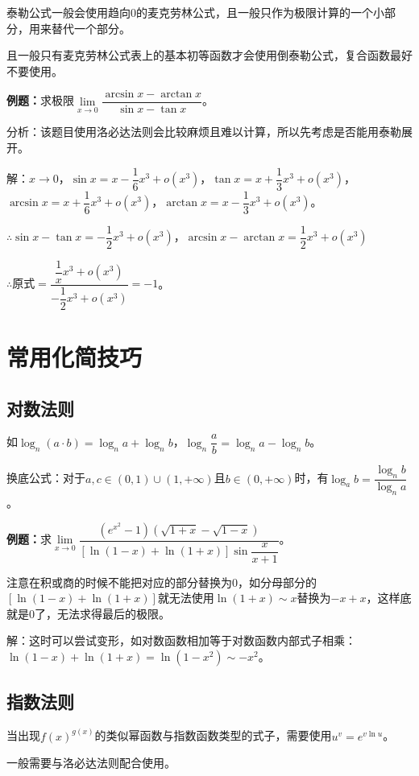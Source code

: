 \documentclass[UTF8, 12pt]{ctexart}
\begin{document}
泰勒公式一般会使用趋向0的麦克劳林公式，且一般只作为极限计算的一个小部分，用来替代一个部分。

且一般只有麦克劳林公式表上的基本初等函数才会使用倒泰勒公式，复合函数最好不要使用。

\textbf{例题：}求极限$\lim\limits_{x\to 0}\dfrac{\arcsin x-\arctan x}{\sin x-\tan x}$。\medskip

分析：该题目使用洛必达法则会比较麻烦且难以计算，所以先考虑是否能用泰勒展开。

解：$x\to 0$，$\sin x=x-\dfrac{1}{6}x^3+o(x^3)$，$\tan x=x+\dfrac{1}{3}x^3+o(x^3)$，$\arcsin x=x+\dfrac{1}{6}x^3+o(x^3)$，$\arctan x=x-\dfrac{1}{3}x^3+o(x^3)$。

$\therefore \sin x-\tan x=-\dfrac{1}{2}x^3+o(x^3)$，$\arcsin x-\arctan x=\dfrac{1}{2}x^3+o(x^3)$

$\therefore \text{原式}=\dfrac{\dfrac{1}{x}x^3+o(x^3)}{-\dfrac{1}{2}x^3+o(x^3)}=-1$。

\section{常用化简技巧}

\subsection{对数法则}

如$\log_n(a\cdot b)=\log_n a+\log_n b$，$\log_n\dfrac{a}{b}=\log_na-\log_nb$。

换底公式：对于$a,c\in(0,1)\cup(1,+\infty)$且$b\in(0,+\infty)$时，有$\log_ab=\dfrac{\log_nb}{\log_na}$。

\textbf{例题：}求$\lim\limits_{x\to 0}\dfrac{(e^{x^2}-1)(\sqrt{1+x}-\sqrt{1-x})}{[\ln(1-x)+\ln(1+x)]\sin\dfrac{x}{x+1}}$。

注意在积或商的时候不能把对应的部分替换为0，如分母部分的$[\ln(1-x)+\ln(1+x)]$就无法使用$\ln(1+x)\sim x$替换为$-x+x$，这样底就是0了，无法求得最后的极限。

解：这时可以尝试变形，如对数函数相加等于对数函数内部式子相乘：$\ln(1-x)+\ln(1+x)=\ln(1-x^2)\sim-x^2$。

\subsection{指数法则}

当出现$f(x)^{g(x)}$的类似幂函数与指数函数类型的式子，需要使用$u^v=e^{v\ln u}$。

一般需要与洛必达法则配合使用。
\end{document}
